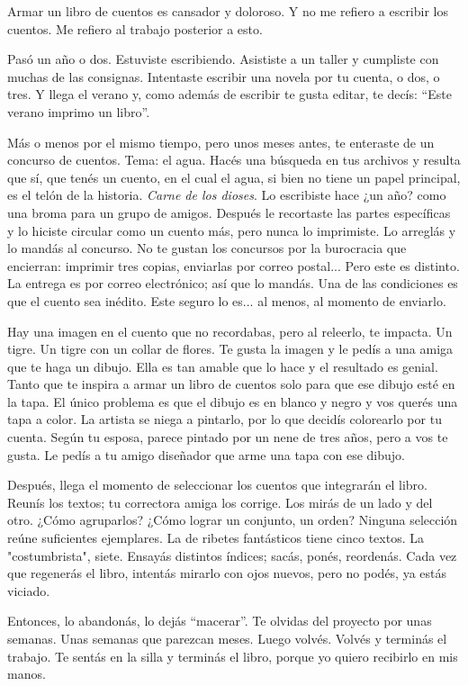 \documentclass[11pt,twoside,openright]{book}
\begin{document}
\begin{em}
Armar un libro de cuentos es cansador y doloroso. Y no me refiero a escribir los cuentos. Me refiero al trabajo posterior a esto.

Pasó un año o dos. Estuviste escribiendo. Asististe a un taller y cumpliste con muchas de las consignas. Intentaste escribir una novela por tu cuenta, o dos, o tres. Y llega el verano y, como además de escribir te gusta editar, te decís: “Este verano imprimo un libro”.

Más o menos por el mismo tiempo, pero unos meses antes, te enteraste de un concurso de cuentos. Tema: el agua. Hacés una búsqueda en tus archivos y resulta que sí, que tenés un cuento, en el cual el agua, si bien no tiene un papel principal, es el telón de la historia. \emph{Carne de los dioses}. Lo escribiste hace ¿un año? como una broma para un grupo de amigos. Después le recortaste las partes específicas y lo hiciste circular como un cuento más, pero nunca lo imprimiste. Lo arreglás y lo mandás al concurso. No te gustan los concursos por la burocracia que encierran: imprimir tres copias, enviarlas por correo postal... Pero este es distinto. La entrega es por correo electrónico; así que lo mandás. Una de las condiciones es que el cuento sea inédito. Este seguro lo es... al menos, al momento de enviarlo.

Hay una imagen en el cuento que no recordabas, pero al releerlo, te impacta. Un tigre. Un tigre con un collar de flores. Te gusta la imagen y le pedís a una amiga que te haga un dibujo. Ella es tan amable que lo hace y el resultado es genial. Tanto que te inspira a armar un libro de cuentos solo para que ese dibujo esté en la tapa. El único problema es que el dibujo es en blanco y negro y vos querés una tapa a color. La artista se niega a pintarlo, por lo que decidís colorearlo por tu cuenta. Según tu esposa, parece pintado por un nene de tres años, pero a vos te gusta. Le pedís a tu amigo diseñador que arme una tapa con ese dibujo.

Después, llega  el momento de seleccionar los cuentos que integrarán el libro. Reunís los textos; tu correctora amiga los corrige. Los mirás de un lado y del otro. ¿Cómo agruparlos? ¿Cómo lograr un conjunto, un orden? Ninguna selección reúne suficientes ejemplares. La de ribetes fantásticos tiene cinco textos. La "costumbrista", siete. Ensayás distintos índices; sacás, ponés, reordenás. Cada vez que regenerás el libro, intentás mirarlo con ojos nuevos, pero no podés, ya estás viciado.

Entonces, lo abandonás, lo dejás “macerar”. Te olvidas del proyecto por unas semanas. Unas semanas que parezcan meses. Luego volvés. Volvés y terminás el trabajo. Te sentás en la silla y terminás el libro, porque yo quiero recibirlo en mis manos.

\end{em}
\end{document}
